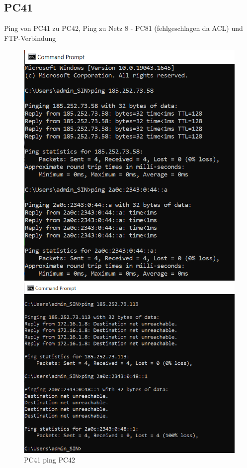 \documentclass{article}
\begin{document}
\pagebreak
\subsection{PC41}
Ping von PC41 zu PC42, Ping zu Netz 8 - PC81 (fehlgeschlagen da ACL) und FTP-Verbindung\\
\begin{figure}[!htp]
  \centering
  \begin{minipage}[b]{0.25\textwidth}
    \includegraphics[width=\textwidth]{Arbeitsergebnisse/PC41/pc41_ping_pc42.png}
    \caption{PC41 ping PC42}
  \end{minipage}
  \hspace{0.8cm}
  \begin{minipage}[b]{0.25\textwidth}
    \includegraphics[width=\textwidth]{Arbeitsergebnisse/PC41/pc41_ping_failed.png}

\end{minipage}
\end{figure}
\end{document}
